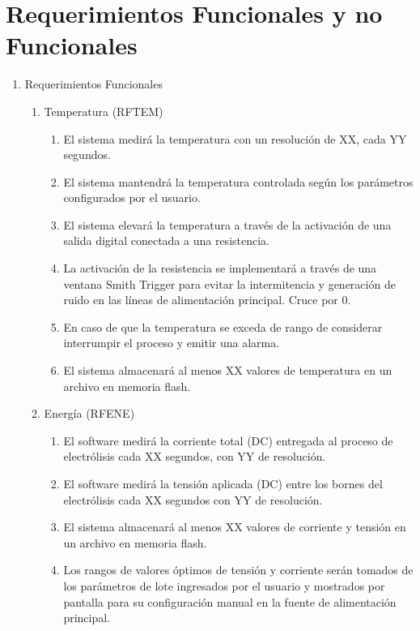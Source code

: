 
\chapter{ Requerimientos Funcionales y no Funcionales } %

\label{AppendixC} %

\begin{enumerate}

\item Requerimientos Funcionales
\begin{enumerate}

\item Temperatura (RFTEM)
\begin{enumerate}
\item El sistema medirá la temperatura con un resolución de XX, cada YY segundos.
\item El sistema mantendrá la temperatura controlada según los parámetros configurados por el usuario.
\item El sistema elevará la temperatura a través de la activación de una salida digital conectada a una resistencia.
\item La activación de la resistencia se implementará a través de una ventana Smith Trigger para evitar la intermitencia y generación de ruido en las líneas de alimentación principal. Cruce por 0.
\item En caso de que la temperatura se exceda de rango de considerar interrumpir el proceso y emitir una alarma.
\item El sistema almacenará al menos XX valores de temperatura en un archivo en memoria flash.
\end{enumerate}

\item Energía (RFENE)
\begin{enumerate}
\item El software medirá la corriente total (DC) entregada al proceso de electrólisis cada XX segundos, con YY de resolución.
\item El software medirá la tensión aplicada (DC) entre los bornes del electrólisis cada XX segundos con YY de resolución.
\item El sistema almacenará al menos XX valores de corriente y tensión en un archivo en memoria flash.
\item Los rangos de valores óptimos de tensión y corriente serán tomados de los parámetros de lote ingresados por el usuario y mostrados por pantalla para su configuración manual en la fuente de alimentación principal.
\end{enumerate}


\end{enumerate}
\end{enumerate}
